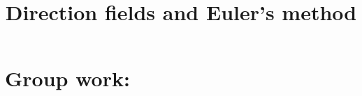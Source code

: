 \documentclass[handout]{ximera}
\title{Direction fields and Euler's method}
\begin{document}
\begin{abstract}		\end{abstract}
\maketitle

\section{Group work:}
\end{document}
